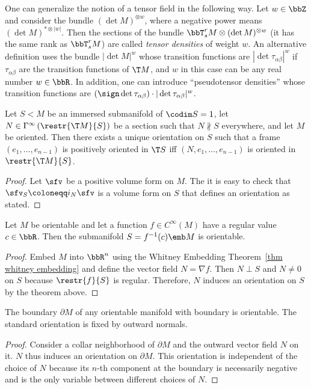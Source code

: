 \begin{defn}\label{def tensor densities}
    One can generalize the notion of a tensor field in the following way. Let $w\in\bbZ$ and consider the bundle $(\det M)^{\otimes w}$, where a negative power means $(\det M)^{\ast\otimes |w|}$. Then the sections of the bundle $\bbT^r_s M\otimes (\det M)^{\otimes w}$ (it has the same rank as $\bbT^r_s M$) are called \emph{tensor densities} of weight $w$. An alternative definition uses the bundle $\left|\det M\right|^{w}$ whose transition functions are $|\det\tau_{\alpha\beta}|^w$ if $\tau_{\alpha\beta}$ are the transition functions of $\T M$, and $w$ in this case can be any real number $w\in\bbR $. In addition, one can introduce ``pseudotensor densities'' whose transition functions are $(\sign\det\tau_{\alpha\beta})\cdot |\det\tau_{\alpha\beta}|^w$.
\end{defn}

\begin{thm}\label{thm orientation via normal vector}
    Let $S<M$ be an immersed submanifold of $\codim S=1$, let $N\in\Gamma^\infty\left(\restr{\T M}{S}\right)$ be a section such that $N\not\parallel S$ everywhere, and let $M$ be oriented. Then there exists a unique orientation on $S$ such that a frame $(e_1,\ldots,e_{n-1})$ is positively oriented in $\T S$ iff $(N,e_1,\ldots,e_{n-1})$ is oriented in $\restr{\T M}{S}$.
\end{thm}
\begin{proof}
    Let $\sfv$ be a positive volume form on $M$. The it is easy to check that $\sfv_S\coloneqq i_N \sfv$ is a volume form on $S$ that defines an orientation as stated.
\end{proof}
\begin{cor}
    Let $M$ be orientable and let a function $f\in C^\infty(M)$ have a regular value $c\in \bbR $. Then the submanifold $S=f^{-1}(c)\emb M$ is orientable.
\end{cor}
\begin{proof}
    Embed $M$ into $\bbR^n$ using the Whitney Embedding Theorem~\ref{thm whitney embedding} and define the vector field $N=\nabla f$. Then $N\perp S$ and $N\neq 0$ on $S$ because $\restr{f}{S}$ is regular. Therefore, $N$ induces an orientation on $S$ by the theorem above.
\end{proof}
\begin{cor}
    The boundary $\partial M$ of any orientable manifold with boundary is orientable. The standard orientation is fixed by outward normals.
\end{cor}
\begin{proof}
    Consider a collar neighborhood of $\partial M$ and the outward vector field $N$ on it. $N$ thus induces an orientation on $\partial M$. This orientation is independent of the choice of $N$ because its $n$-th component at the boundary is necessarily negative and is the only variable between different choices of $N$.
\end{proof}


